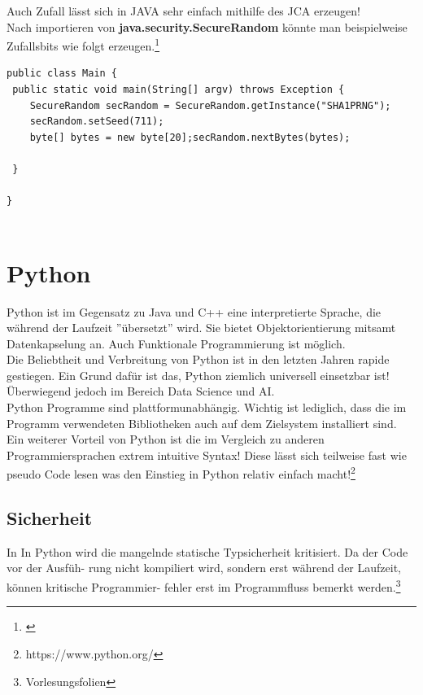 \documentclass[a4paper,12pt]{scrartcl}
\begin{document}
Auch Zufall lässt sich in JAVA sehr einfach mithilfe des JCA erzeugen!\\
Nach importieren von \textbf{java.security.SecureRandom} könnte man beispielweise Zufallsbits wie folgt erzeugen.\footnote{\cite{1265452}}
\begin{verbatim}
public class Main {
 public static void main(String[] argv) throws Exception {
    SecureRandom secRandom = SecureRandom.getInstance("SHA1PRNG");
    secRandom.setSeed(711);
    byte[] bytes = new byte[20];secRandom.nextBytes(bytes);

 }

}


\end{verbatim}
\newpage



\section{Python}
Python ist im Gegensatz zu Java und C++ eine interpretierte Sprache, die während der
Laufzeit ”übersetzt” wird. Sie bietet Objektorientierung mitsamt Datenkapselung an. Auch Funktionale Programmierung ist möglich.\\
Die Beliebtheit und Verbreitung von Python ist in den letzten
Jahren rapide gestiegen. Ein Grund dafür ist das, Python ziemlich universell einsetzbar ist! Überwiegend jedoch im Bereich Data Science und AI.\\Python Programme sind plattformunabhängig. Wichtig ist lediglich, dass die im Programm
verwendeten Bibliotheken auch auf dem Zielsystem installiert sind.\\
Ein weiterer Vorteil von Python ist die im Vergleich zu anderen Programmiersprachen extrem intuitive Syntax! Diese lässt sich teilweise fast wie pseudo Code lesen was den Einstieg in Python relativ einfach macht!\footnote{https://www.python.org/}

\subsection{Sicherheit}
In 
In Python wird die mangelnde statische Typsicherheit kritisiert. Da der Code vor der Ausfüh-
rung nicht kompiliert wird, sondern erst während der Laufzeit, können kritische Programmier-
fehler erst im Programmfluss bemerkt werden.\footnote{Vorlesungsfolien}
\newpage
\end{document}
